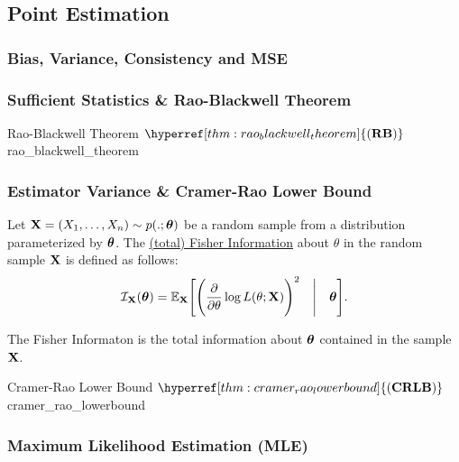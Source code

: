 
\subsection{Point Estimation}
\newcommand{\RB}{\hyperref[thm:rao_blackwell_theorem]{(\mathrm{{\bf RB}})}}
\newcommand{\CRLB}{\hyperref[thm:cramer_rao_lowerbound]{(\mathrm{{\bf CRLB}})}}

\subsubsection{Bias, Variance, Consistency and MSE}

\subsubsection{Sufficient Statistics \& Rao-Blackwell Theorem}
\begin{theorem}{Rao-Blackwell Theorem $\RB$}{rao_blackwell_theorem}
     
\end{theorem}


\subsubsection{Estimator Variance \& Cramer-Rao Lower Bound}
\begin{definition}
    Let ${\bf X}=(X_1, \dots, X_n) \sim p(.;\boldsymbol{\theta})$ be a random sample from a distribution parameterized by $\boldsymbol{\theta}$. The \underline{(total) Fisher Information} about $\theta$ in the random sample ${\bf X}$ is defined as follows:
    \begin{equation}
        \mathcal{I}_{\bf X}(\boldsymbol{\theta}) = \mathbb{E}_{\bf X}\Bigg[ 
            \Bigg( 
                \frac{\partial}{\partial\theta}\log L(\theta;{\bf X})
             \Bigg)^2 \quad \Bigg| \quad \boldsymbol{\theta}
         \Bigg].
    \end{equation}

    \noindent The Fisher Informaton is the total information about $\boldsymbol{\theta}$ contained in the sample ${\bf X}$.
\end{definition}


\begin{theorem}{Cramer-Rao Lower Bound $\CRLB$}{cramer_rao_lowerbound}

\end{theorem}


\subsubsection{Maximum Likelihood Estimation (MLE)}


